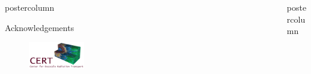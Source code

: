 \documentclass[xcolor=dvipsnames]{beamer}
\newlength{\columnheight}
\begin{document}
\begin{frame}
\begin{columns}
\begin{column}{.49\textwidth}
\begin{beamercolorbox}[center,wd=\textwidth]{postercolumn}
\begin{minipage}[T]{0.95\textwidth}
{%
\vfill
    \begin{block}{Acknowledgements}
        \begin{figure}
            \centering
            \includegraphics[width=0.25\textwidth]{cert_logo_maroon.png}
     \end{figure}
    \end{block}
}
\end{minipage}
\end{beamercolorbox}
\end{column}
\begin{column}{.49\textwidth}
\begin{beamercolorbox}[center,wd=\textwidth]{postercolumn}
\begin{minipage}[T]{0.95\textwidth} %
\parbox[t][\columnheight]{\textwidth}{ %
}
\end{minipage}
\end{beamercolorbox}
\end{column}
\end{columns}
\end{frame}
\end{document}
